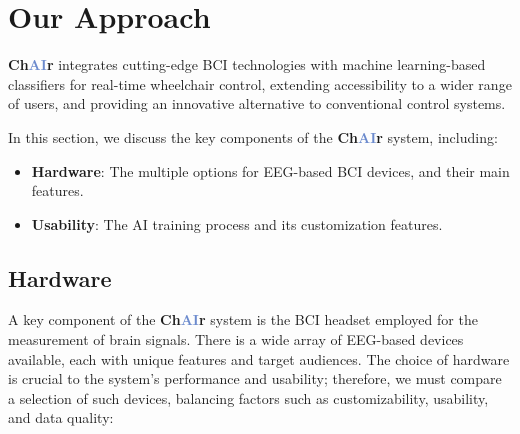 \documentclass[a4paper]{article}
\newcommand\chair{\textbf{Ch\textcolor[HTML]{6B8ACD}{AI}r}\xspace}
\begin{document}
\section{Our Approach}

\chair integrates cutting-edge BCI technologies with machine learning-based
classifiers for real-time wheelchair control, extending accessibility to
a wider range of users, and providing an innovative alternative to conventional control systems.

In this section, we discuss the key components of the \chair system, including:
\begin{itemize}
    \item \textbf{Hardware}: The multiple options for EEG-based BCI devices, and their main features.
    \item \textbf{Usability}: The AI training process and its customization features.
\end{itemize}


\subsection{Hardware}

A key component of the \chair system is the BCI headset employed for the measurement of brain
signals. There is a wide array of EEG-based devices available, each with unique features
and target audiences. The choice of hardware is crucial to the system's performance and
usability; therefore, we must compare a selection of such devices, balancing factors
such as customizability, usability, and data quality:
\end{document}
